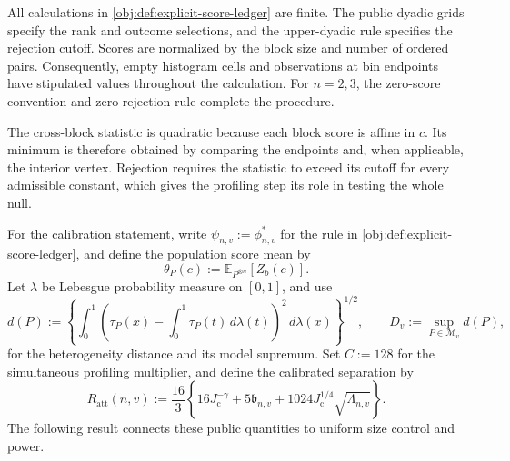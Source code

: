 All calculations in \cref{obj:def:explicit-score-ledger} are finite. The public dyadic grids specify the rank and outcome selections, and the upper-dyadic rule specifies the rejection cutoff. Scores are normalized by the block size and number of ordered pairs. Consequently, empty histogram cells and observations at bin endpoints have stipulated values throughout the calculation. For \(n=2,3\), the zero-score convention and zero rejection rule complete the procedure.

The cross-block statistic  is quadratic because each block score is affine in \(c\). Its minimum is therefore obtained by comparing the endpoints and, when applicable, the interior vertex. Rejection requires the statistic to exceed its cutoff for every admissible constant, which gives the profiling step its role in testing the whole null.

For the calibration statement, write \(\psi_{n,v}:=\phi^*_{n,v}\) for the rule in \cref{obj:def:explicit-score-ledger}, and define the population score mean  by
\[
\theta_P(c):=\mathbb E_{P^{\otimes n}}[Z_b(c)].
\]
Let \(\lambda\) be Lebesgue probability measure on \([0,1]\), and use
\[
d(P):=
\left\{\int_0^1
\left(\tau_P(x)-\int_0^1\tau_P(t)\,d\lambda(t)\right)^2
\,d\lambda(x)\right\}^{1/2},
\qquad
D_v:=\sup_{P\in\mathcal M_v}d(P),
\]
for the heterogeneity distance and its model supremum. Set \(C:=128\) for the simultaneous profiling multiplier, and define the calibrated separation by
\[
R_{\mathrm{att}}(n,v):=\frac{16}{3}
\left\{
16J_{\mathrm c}^{-\gamma}
+5\mathfrak b_{n,v}
+1024J_{\mathrm c}^{1/4}\sqrt{\Lambda_{n,v}}
\right\}.
\]
The following result connects these public quantities to uniform size control and power.

